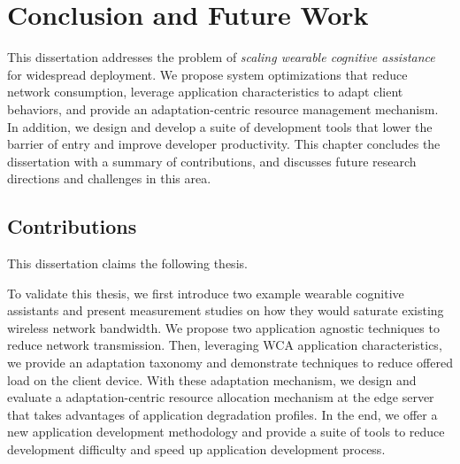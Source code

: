 \chapter{Conclusion and Future Work}

This dissertation addresses the problem of \textit{scaling wearable cognitive
assistance} for widespread deployment. We propose system optimizations that
reduce network consumption, leverage application characteristics to adapt client
behaviors, and provide an adaptation-centric resource management mechanism. In
addition, we design and develop a suite of development tools that lower the
barrier of entry and improve developer productivity. This chapter concludes the
dissertation with a summary of contributions, and discusses future research
directions and challenges in this area.

\section{Contributions}

This dissertation claims the following thesis.

\noindent{}

To validate this thesis, we first introduce two example wearable cognitive
assistants and present measurement studies on how they would saturate existing
wireless network bandwidth. We propose two application agnostic techniques to
reduce network transmission. Then, leveraging WCA application characteristics,
we provide an adaptation taxonomy and demonstrate techniques to reduce offered
load on the client device. With these adaptation mechanism, we design and
evaluate a adaptation-centric resource allocation mechanism at the edge server
that takes advantages of application degradation profiles. In the end, we offer
a new application development methodology and provide a suite of tools to reduce
development difficulty and speed up application development process.


